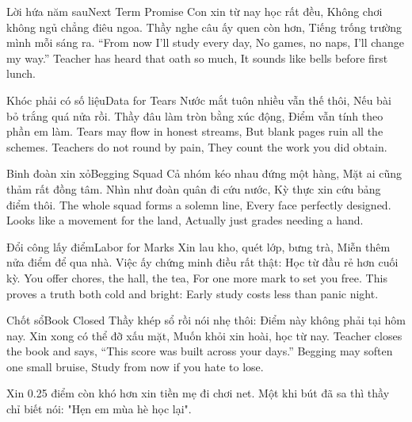 \begin{tutuyetbox}{Lời hứa năm sau}{Next Term Promise}
Con xin từ nay học rất đều,
Không chơi không ngủ chẳng điêu ngoa.
Thầy nghe câu ấy quen còn hơn,
Tiếng trống trường mình mỗi sáng ra.
\tcblower
“From now I'll study every day,
No games, no naps, I'll change my way.”
Teacher has heard that oath so much,
It sounds like bells before first lunch.
\end{tutuyetbox}

\begin{tutuyetbox}{Khóc phải có số liệu}{Data for Tears}
Nước mắt tuôn nhiều vẫn thế thôi,
Nếu bài bỏ trắng quá nửa rồi.
Thầy đâu làm tròn bằng xúc động,
Điểm vẫn tính theo phần em làm.
\tcblower
Tears may flow in honest streams,
But blank pages ruin all the schemes.
Teachers do not round by pain,
They count the work you did obtain.
\end{tutuyetbox}

\begin{tutuyetbox}{Binh đoàn xin xỏ}{Begging Squad}
Cả nhóm kéo nhau đứng một hàng,
Mặt ai cũng thảm rất đồng tâm.
Nhìn như đoàn quân đi cứu nước,
Kỳ thực xin cứu bảng điểm thôi.
\tcblower
The whole squad forms a solemn line,
Every face perfectly designed.
Looks like a movement for the land,
Actually just grades needing a hand.
\end{tutuyetbox}

\begin{tutuyetbox}{Đổi công lấy điểm}{Labor for Marks}
Xin lau kho, quét lớp, bưng trà,
Miễn thêm nửa điểm để qua nhà.
Việc ấy chứng minh điều rất thật:
Học từ đầu rẻ hơn cuối kỳ.
\tcblower
You offer chores, the hall, the tea,
For one more mark to set you free.
This proves a truth both cold and bright:
Early study costs less than panic night.
\end{tutuyetbox}

\begin{tutuyetbox}{Chốt sổ}{Book Closed}
Thầy khép sổ rồi nói nhẹ thôi:
Điểm này không phải tại hôm nay.
Xin xong có thể đỡ xấu mặt,
Muốn khỏi xin hoài, học từ nay.
\tcblower
Teacher closes the book and says,
“This score was built across your days.”
Begging may soften one small bruise,
Study from now if you hate to lose.
\end{tutuyetbox}
\begin{ghichu}
Xin 0.25 điểm còn khó hơn xin tiền mẹ đi chơi net. Một khi bút đã sa thì thầy chỉ biết nói: "Hẹn em mùa hè học lại".
\end{ghichu}
